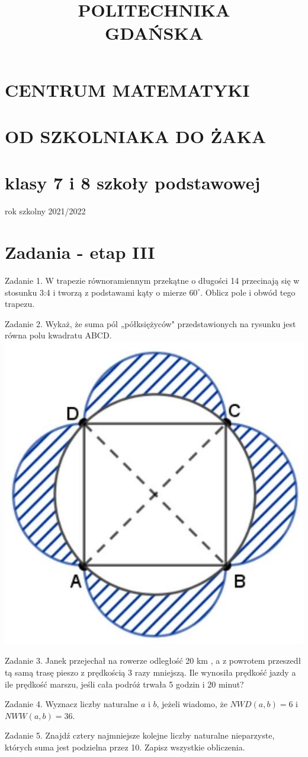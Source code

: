 \documentclass[10pt]{article}
\title{POLITECHNIKA \\
 GDAŃSKA }
\author{}
\date{}
\begin{document}
\maketitle
\section*{CENTRUM MATEMATYKI}
\section*{OD SZKOLNIAKA DO ŻAKA}
\section*{klasy 7 i 8 szkoły podstawowej}
rok szkolny 2021/2022

\section*{Zadania - etap III}
Zadanie 1. W trapezie równoramiennym przekątne o długości 14 przecinają się w stosunku 3:4 i tworzą z podstawami kąty o mierze \(60^{\circ}\). Oblicz pole i obwód tego trapezu.

Zadanie 2. Wykaż, że suma pól „półksiężyców" przedstawionych na rysunku jest równa polu kwadratu ABCD.\\
\includegraphics[max width=\textwidth, center]{2024_11_21_dd87acbd3841c21f8f46g-1}

Zadanie 3. Janek przejechał na rowerze odległość 20 km , a z powrotem przeszedł tą samą trasę pieszo z prędkością 3 razy mniejszą. Ile wynosiła prędkość jazdy a ile prędkość marszu, jeśli cała podróż trwała 5 godzin i 20 minut?

Zadanie 4. Wyznacz liczby naturalne \(a\) i \(b\), jeżeli wiadomo, że \(N W D(a, b)=6\) i \(N W W(a, b)=36\).

Zadanie 5. Znajdź cztery najmniejsze kolejne liczby naturalne nieparzyste, których suma jest podzielna przez 10. Zapisz wszystkie obliczenia.
\end{document}
